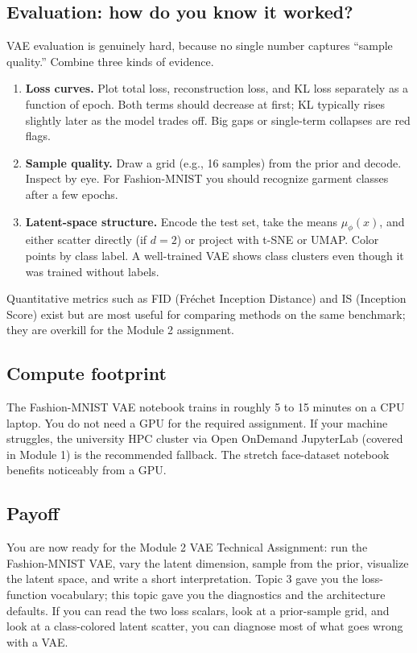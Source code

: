 \documentclass[11pt]{article}
\theoremstyle{remark}
\begin{document}
\subsection{Evaluation: how do you know it worked?}
VAE evaluation is genuinely hard, because no single number captures ``sample quality.'' Combine three kinds of evidence.
\begin{enumerate}[leftmargin=1.6em]
  \item \textbf{Loss curves.} Plot total loss, reconstruction loss, and KL loss separately as a function of epoch. Both terms should decrease at first; KL typically rises slightly later as the model trades off. Big gaps or single-term collapses are red flags.
  \item \textbf{Sample quality.} Draw a grid (e.g., 16 samples) from the prior and decode. Inspect by eye. For Fashion-MNIST you should recognize garment classes after a few epochs.
  \item \textbf{Latent-space structure.} Encode the test set, take the means $\mu_\phi(x)$, and either scatter directly (if $d=2$) or project with t-SNE or UMAP. Color points by class label. A well-trained VAE shows class clusters even though it was trained without labels.
\end{enumerate}
Quantitative metrics such as FID (Fr\'echet Inception Distance) and IS (Inception Score) exist but are most useful for comparing methods on the same benchmark; they are overkill for the Module 2 assignment.

\subsection{Compute footprint}
The Fashion-MNIST VAE notebook trains in roughly 5 to 15 minutes on a CPU laptop. You do not need a GPU for the required assignment. If your machine struggles, the university HPC cluster via Open OnDemand JupyterLab (covered in Module 1) is the recommended fallback. The stretch face-dataset notebook benefits noticeably from a GPU.

\subsection{Payoff}
You are now ready for the Module 2 VAE Technical Assignment: run the Fashion-MNIST VAE, vary the latent dimension, sample from the prior, visualize the latent space, and write a short interpretation. Topic 3 gave you the loss-function vocabulary; this topic gave you the diagnostics and the architecture defaults. If you can read the two loss scalars, look at a prior-sample grid, and look at a class-colored latent scatter, you can diagnose most of what goes wrong with a VAE.
\end{document}
